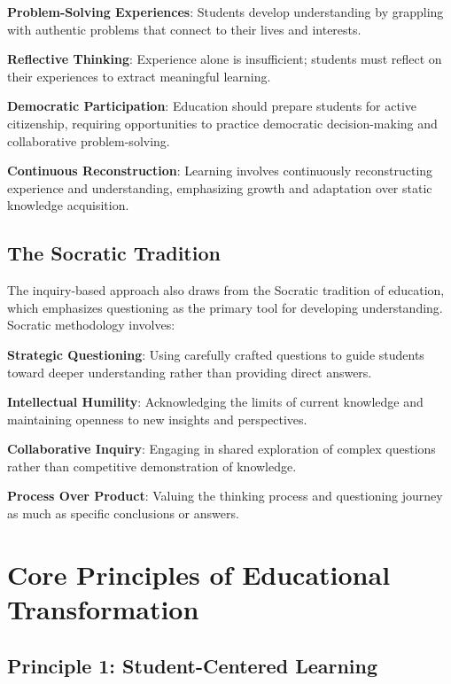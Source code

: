 \documentclass[
  Letterpaper,
]{scrbook}
\begin{document}
\textbf{Problem-Solving Experiences}: Students develop understanding by
grappling with authentic problems that connect to their lives and
interests.

\textbf{Reflective Thinking}: Experience alone is insufficient; students
must reflect on their experiences to extract meaningful learning.

\textbf{Democratic Participation}: Education should prepare students for
active citizenship, requiring opportunities to practice democratic
decision-making and collaborative problem-solving.

\textbf{Continuous Reconstruction}: Learning involves continuously
reconstructing experience and understanding, emphasizing growth and
adaptation over static knowledge acquisition.

\subsection{The Socratic Tradition}\label{the-socratic-tradition}

The inquiry-based approach also draws from the Socratic tradition of
education, which emphasizes questioning as the primary tool for
developing understanding. Socratic methodology involves:

\textbf{Strategic Questioning}: Using carefully crafted questions to
guide students toward deeper understanding rather than providing direct
answers.

\textbf{Intellectual Humility}: Acknowledging the limits of current
knowledge and maintaining openness to new insights and perspectives.

\textbf{Collaborative Inquiry}: Engaging in shared exploration of
complex questions rather than competitive demonstration of knowledge.

\textbf{Process Over Product}: Valuing the thinking process and
questioning journey as much as specific conclusions or answers.

\section{Core Principles of Educational
Transformation}\label{core-principles-of-educational-transformation}

\subsection{Principle 1: Student-Centered
Learning}\label{principle-1-student-centered-learning}
\end{document}
